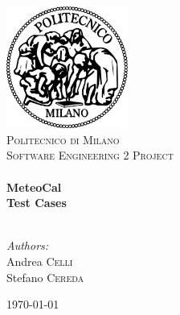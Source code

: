 \begin{titlepage}
\begin{center}

\includegraphics[width=0.30\textwidth]{./images/logo}~\\[1cm]
\textsc{\LARGE Politecnico di Milano}\\[1.5cm]

\textsc{\Large Software Engineering 2 Project}\\[0.5cm]

\HRule \\[0.4cm]
{ \Huge \bfseries MeteoCal \\[0.4cm] }
{ \huge \bfseries Test Cases \\[0.4cm] }
\HRule \\[1.5cm]

\begin{flushright}
\noindent
\large
\emph{Authors:}\\
Andrea \textsc{Celli}\\
Stefano \textsc{Cereda}
\end{flushright}
\vfill

{\large \today}

\end{center}
\end{titlepage}